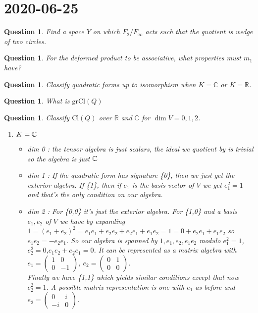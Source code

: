\documentclass[a4paper]{article}
\newtheorem{que}[thm]{Question}
\begin{document}
\section*{ 2020-06-25}

\begin{que} Find a space $Y$ on which $F_2/F_\infty$ acts such that the quotient is wedge of two circles.

\end{que} 
\begin{que} For the deformed product to be associative, what properties must $m_1$ have?
	
	
\end{que}
\begin{que} Classify quadratic forms up to isomorphism when $K = \mathbb{C}$ or $K = \mathbb{R}$. 
	

\end{que}
\begin{que} What is $\text{gr}  \text{Cl}(Q)$
\end{que}
\begin{que} Classify $ \text{Cl}(Q)$ over $\mathbb{R}$ and $\mathbb{C}$ for $\dim V = 0, 1, 2$.\\
 \begin{enumerate}
     \item $K=\mathbb{C}$
         \begin{itemize}
             \item dim 0 : the tensor algebra is just scalars, the ideal we quotient by is trivial so the algebra is just $\mathbb{C}$
             \item dim 1 : If the quadratic form  has signature \{0\}, then we just get the exterior algebra. If \{1\}, then if $e_1$ is the basis vector of $V$ we get $e_1^2=1$ and that's the only condition on our algebra.
             \item dim 2 : For \{0,0\} it's just the exterior algebra. For \{1,0\} and a basis $e_1,e_2$ of $V$ we have by expanding  $1=\left( e_1+e_2 \right)^2=e_1e_1+e_2e_2+e_2e_1+e_1e_2=1=0+e_2e_1+e_1e_2 $ so $e_1e_2=-e_2e_1$. So our algebra is spanned by $1,e_1,e_2,e_1e_2$ modulo $e_1^2=1$,$e_2^2=0$,$e_1e_2+e_2e_1=0$. It can be represented as a matrix algebra with $e_1=\begin{pmatrix} 1 & 0\\0 & -1 \end{pmatrix} $, $e_2=\begin{pmatrix} 0 & 1\\0 & 0 \end{pmatrix} $.\\
                 Finally we have \{1,1\} which yields similar conditions except that now $e_2^2=1$. A possible matrix representation is one with $e_1$ as before and $e_2=\begin{pmatrix} 0 & i\\-i & 0  \end{pmatrix} $.
         \end{itemize}
 \end{enumerate}

\end{que}
\end{document}
